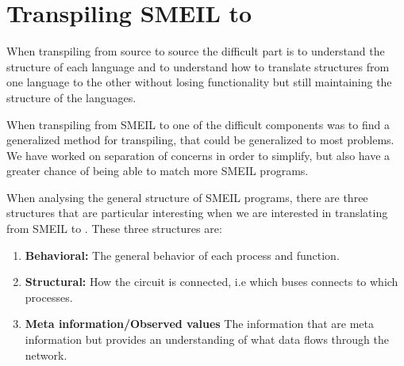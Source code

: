 





\section{Transpiling SMEIL to \cspm{}} \label{sec:transpiling}
When transpiling from source to source the difficult part is to understand the structure of each language and to understand how to translate structures from one language to the other without losing functionality but still maintaining the structure of the languages.

When transpiling from SMEIL to \cspm{} one of the difficult components was to find a generalized method for transpiling, that could be generalized to most problems. We have worked on separation of concerns in order to simplify, but also have a greater chance of being able to match more SMEIL programs.







When analysing the general structure of SMEIL programs, there are three structures that are particular interesting when we are interested in translating from SMEIL to \cspm{}. These three structures are:
\begin{enumerate}
    \item \textbf{Behavioral:} The general behavior of each process and function.
    \item \textbf{Structural:} How the circuit is connected, i.e which buses connects to which processes.
    \item \textbf{Meta information/Observed values} %
    The information that are meta information but provides an understanding of what data flows through the network.
\end{enumerate}


